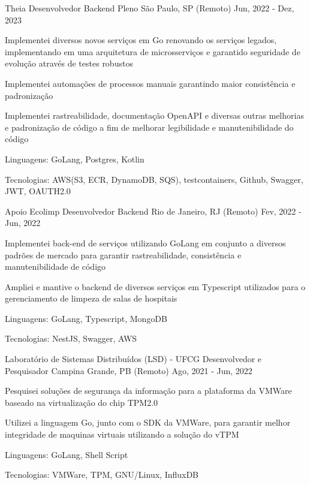 
\begin{cventries}
  \cventry
  {Theia} %
  {Desenvolvedor Backend Pleno} %
  {São Paulo, SP (Remoto)} %
  {Jun, 2022 - Dez, 2023} %
  {
    \begin{cvitems} %
      \item {Implementei diversos novos serviços em Go renovando os serviços legados, implementando em uma arquitetura de microsserviços e garantido seguridade de evolução através de testes robustos}
      \item {Implementei automações de processos manuais garantindo maior consistência e padronização}
      \item {Implementei rastreabilidade, documentação OpenAPI e diversas outras melhorias e padronização de código a fim de melhorar legibilidade e manutenibilidade do código}
      \item {Linguagens: GoLang, Postgres, Kotlin}
      \item {Tecnologias: AWS(S3, ECR, DynamoDB, SQS), testcontainers, Github, Swagger, JWT, OAUTH2.0}
    \end{cvitems}
  }

  \cventry
  {Apoio Ecolimp} %
  {Desenvolvedor Backend} %
  {Rio de Janeiro, RJ (Remoto)} %
  {Fev, 2022 - Jun, 2022} %
  {
    \begin{cvitems} %
      \item {Implementei back-end de serviços utilizando GoLang em conjunto a diversos padrões de mercado para garantir rastreabilidade, consistência e manutenibilidade de código}
      \item {Ampliei e mantive o backend de diversos serviços em Typescript utilizados para o gerenciamento de limpeza de salas de hospitais}
      \item {Linguagens: GoLang, Typescript, MongoDB}
      \item {Tecnologias: NestJS, Swagger, AWS}
    \end{cvitems}
  }

  \cventry
  {Laboratório de Sistemas Distribuídos (LSD) - UFCG} %
  {Desenvolvedor e Pesquisador} %
  {Campina Grande, PB (Remoto)} %
  {Ago, 2021 - Jun, 2022} %
  {
    \begin{cvitems} %
      \item {Pesquisei soluções de segurança da informação para a plataforma da VMWare baseado na virtualização do chip TPM2.0}
      \item {Utilizei a linguagem Go, junto com o SDK da VMWare, para garantir melhor integridade de maquinas virtuais utilizando a solução do vTPM}
      \item {Linguagens: GoLang, Shell Script}
      \item {Tecnologias: VMWare, TPM, GNU/Linux, InfluxDB}
    \end{cvitems}
  }


\end{cventries}
